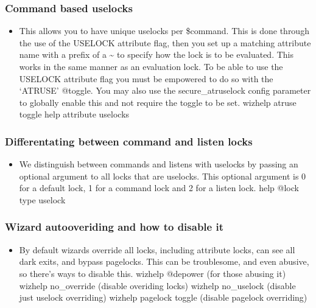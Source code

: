\documentclass[letterpaper,10pt,english]{sphinxmanual}
\begin{document}
\subsubsection{Command based uselocks}
\label{\detokenize{features:command-based-uselocks}}\begin{itemize}
\item {} 
\sphinxAtStartPar
This allows you to have unique uselocks per \$command.  This is done
through the use of the USELOCK attribute flag, then you set up
a matching attribute name with a prefix of a \textasciitilde{} to specify how
the lock is to be evaluated.  This works in the same manner
as an evaluation lock.  To be able to use the USELOCK attribute flag
you must be empowered to do so with the ‘ATRUSE’ @toggle.  You may
also use the secure\_atruselock config parameter to globally enable
this and not require the toggle to be set.
\sphinxhyphen{} wizhelp atruse toggle
\sphinxhyphen{} help attribute uselocks

\end{itemize}


\subsubsection{Differentating between command and listen locks}
\label{\detokenize{features:differentating-between-command-and-listen-locks}}\begin{itemize}
\item {} 
\sphinxAtStartPar
We distinguish between commands and listens with uselocks by passing
an optional argument to all locks that are uselocks.  This optional
argument is 0 for a default lock, 1 for a command lock and 2 for
a listen lock.
\sphinxhyphen{} help @lock type uselock

\end{itemize}


\subsubsection{Wizard auto\sphinxhyphen{}overiding and how to disable it}
\label{\detokenize{features:wizard-auto-overiding-and-how-to-disable-it}}\begin{itemize}
\item {} 
\sphinxAtStartPar
By default wizards override all locks, including attribute locks,
can see all dark exits, and bypass pagelocks.  This can be
troublesome, and even abusive, so there’s ways to disable this.
\sphinxhyphen{} wizhelp @depower (for those abusing it)
\sphinxhyphen{} wizhelp no\_override (disable overiding locks)
\sphinxhyphen{} wizhelp no\_uselock (disable just uselock overriding)
\sphinxhyphen{} wizhelp pagelock toggle (disable pagelock overriding)

\end{itemize}
\end{document}

